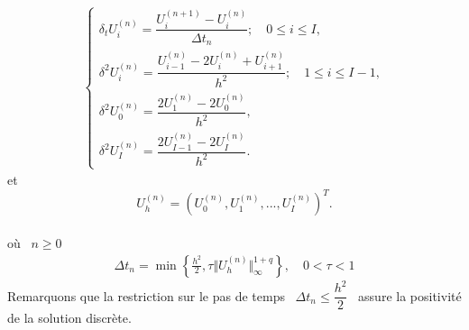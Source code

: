 \documentclass[10pt]{beamer}
\begin{document}
\begin{frame}
\begin{eqnarray}
	\begin{cases}
		\delta_t U_i^{(n)}=\dfrac{U_i^{(n+1)}-U_i^{(n)}}{\Delta t_n};\quad 0\leqslant i\leqslant I,\\
		\delta^{2}U_i^{(n)}=\dfrac{U_{i-1}^{(n)}-2U_i^{(n)}+U_{i+1}^{(n)}}{h^2};\quad 1\leqslant i\leqslant I-1,\\
		\delta^{2}U^{(n)}_{0}=\dfrac{2U^{(n)}_{1}-2U^{(n)}_{0}}{h^{2}},\\
		\delta^{2}U^{(n)}_{I}=\dfrac{2U^{(n)}_{I-1}-2U^{(n)}_{I}}{h^{2}}.   
	\end{cases}
\end{eqnarray}
et 
\ $$U_h^{(n)}=(U^{(n)}_0,U^{(n)}_1,...,U^{(n)}_I)^T .$$\\

où  \ $ n\geqslant 0$ \ 
\begin{eqnarray*} 
	\Delta t_n= \min\left\lbrace  \frac{h^2}{2},\tau\Vert U_h^{(n)}\Vert_\infty ^{1+q} \right\rbrace, \quad 0<\tau < 1
\end{eqnarray*} 
Remarquons que la restriction sur le pas de temps \ $ \Delta t_n\leq \dfrac{h^2}{2} $ \ assure la positivité de la solution discrète.   
\end{frame} 
 
\end{document}
